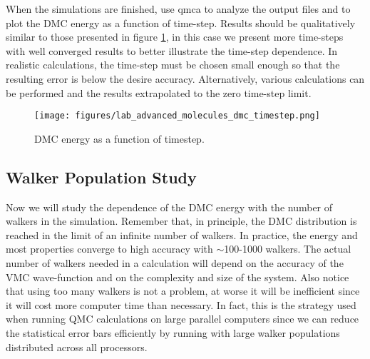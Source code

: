 When the simulations are finished, use qmca to analyze the output files and to plot the
DMC energy as a function of time-step. Results should be qualitatively similar to those
presented in figure \ref{fig:lam_dmc_timestep}, in this case we present more time-steps with well converged results to
better illustrate the time-step dependence. In realistic calculations, the time-step must be
chosen small enough so that the resulting error is below the desire accuracy. Alternatively,
various calculations can be performed and the results extrapolated to the zero time-step
limit.


\begin{figure}
\begin{center}
\texttt{[image: figures/lab\_advanced\_molecules\_dmc\_timestep.png]}
\end{center}
\caption{DMC energy as a function of timestep.
\label{fig:lam_dmc_timestep}
}
\end{figure}


\subsection{Walker Population Study}
Now we will study the dependence of the DMC energy with the number of walkers in the
simulation. Remember that, in principle, the DMC distribution is reached in the limit of
an infinite number of walkers. In practice, the energy and most properties converge to high
accuracy with $\sim$100-1000 walkers. The actual number of walkers needed in a calculation
will depend on the accuracy of the VMC wave-function and on the complexity and size of
the system. Also notice that using too many walkers is not a problem, at worse it will be
inefficient since it will cost more computer time than necessary. In fact, this is the strategy
used when running QMC calculations on large parallel computers since we can reduce the
statistical error bars efficiently by running with large walker populations distributed across
all processors.

